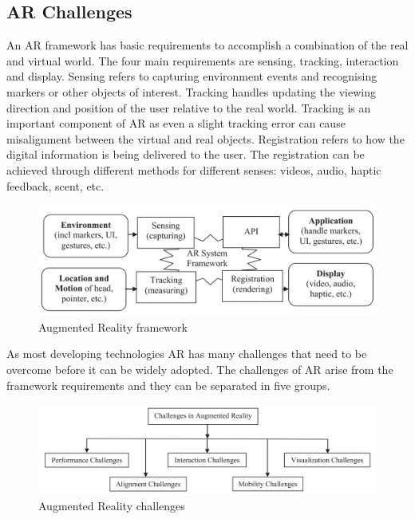 \documentclass[12pt, a4paper,oneside, nocenter]{thesis}
\begin{document}
\subsection{AR Challenges}
An AR framework has basic requirements to accomplish a combination of the real and virtual world.
The four main requirements are sensing, tracking, interaction and display. Sensing refers to
capturing environment events and recognising markers or other objects of interest. Tracking handles updating the
viewing direction and position of the user relative to the real world. Tracking is an important component
of AR as even a slight tracking error can cause misalignment between the virtual and real objects\citep{ar-design}. 
Registration refers to how the digital information is being delivered to the user. The registration can be achieved
through different methods for different senses: videos, audio, haptic feedback, scent, etc.
\begin{figure}[H]
\includegraphics[width=\textwidth]{ar-framework}
\caption{Augmented Reality framework\citep{vrjournal}}
\label{fig:ar-framework}
\end{figure}
As most developing technologies AR has many challenges that need to be overcome before it can be widely adopted.
The challenges of AR arise from the framework requirements and they can be separated in five groups.
\begin{figure}[H]
\includegraphics[width=\textwidth]{ar-challenges}
\caption{Augmented Reality challenges\citep{Acta-Graphica}}
\label{fig:ar-challenges}
\end{figure}
\end{document}
